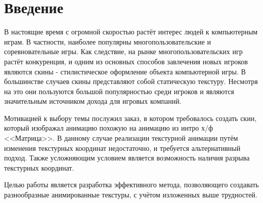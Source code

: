 \chapter*{Введение} %

В настоящие время с огромной скоростью растёт интерес людей к компьютерным играм. В частности, наиболее популярны многопользовательские и соревновательные игры. Как следствие, на рынке многопользовательских игр растёт конкуренция, и одним из основных способов завлечения новых игроков являются скины - стилистическое оформление объекта компьютерной игры. В большинстве случаев скины представляют собой статическую текстуру. Несмотря на это они пользуются большой популярностью среди игроков и являются значительным источником дохода для игровых компаний.

Мотивацией к выбору темы послужил заказ, в котором требовалось создать скин, который изображал анимацию похожую на анимацию из интро х/ф <<Матрица>>. В данному случае реализации текстурной анимации путём изменения текстурных координат недостаточно, и требуется альтернативный подход. Также усложняющим условием является возможность наличия разрыва текстурных координат.

Целью работы является разработка эффективного метода, позволяющего создавать разнообразные анимированные текстуры, с учётом изложенных выше трудностей.
